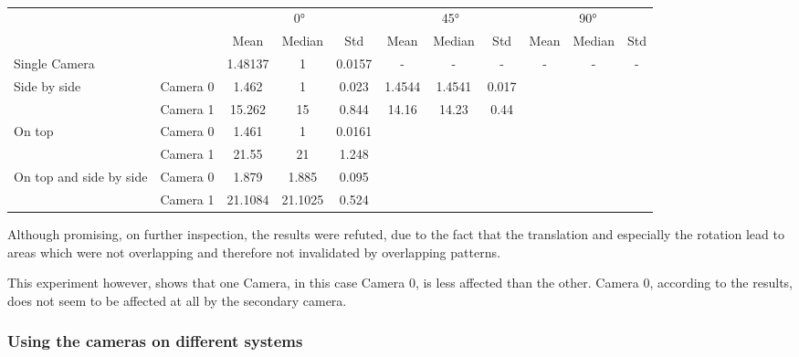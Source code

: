 \begin{landscape}
\begin{table}[]
\caption{}
\label{tab:different camera positions}
\begin{tabular}{lc|ccc|ccc|ccc}
                        &                       & \multicolumn{3}{c|}{0°}    & \multicolumn{3}{c|}{45°} & \multicolumn{3}{c}{90°} \\
                        & \multicolumn{1}{l|}{} & Mean    & Median  & Std    & Mean    & Median & Std   & Mean   & Median  & Std  \\ \hline
Single Camera           & \multicolumn{1}{l|}{} & 1.48137 & 1       & 0.0157 & -       & -      & -     & -      & -       & -    \\ \hline
Side by side            & Camera 0              & 1.462   & 1       & 0.023  & 1.4544  & 1.4541 & 0.017 &        &         &      \\
                        & Camera 1              & 15.262  & 15      & 0.844  & 14.16   & 14.23  & 0.44  &        &         &      \\ \hline
On top                  & Camera 0              & 1.461   & 1       & 0.0161 &         &        &       &        &         &      \\
                        & Camera 1              & 21.55   & 21      & 1.248  &         &        &       &        &         &      \\ \hline
On top and side by side & Camera 0              & 1.879   & 1.885   & 0.095  &         &        &       &        &         &      \\
                        & Camera 1              & 21.1084 & 21.1025 & 0.524  &         &        &       &        &         &     
\end{tabular}
\end{table}
\end{landscape}

Although promising, on further inspection, the results were refuted, due to the fact that the translation and especially the rotation lead to areas which were not overlapping and therefore not invalidated by overlapping patterns.

This experiment however, shows that one Camera, in this case Camera 0, is less affected than the other. Camera 0, according to the results, does not seem to be affected at all by the secondary camera.

\subsubsection{Using the cameras on different systems}

